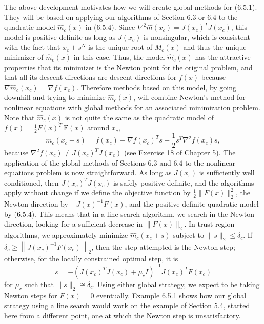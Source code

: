 The above development motivates how we will create global methods for (6.5.1). They will be based on applying our algorithms of Section \(6.3\) or \(6.4\) to the quadratic model \(\hat{m}_{c}(x)\) in (6.5.4). Since \(\nabla^{2} \hat{m}\left(x_{c}\right)=J\left(x_{c}\right)^{T} J\left(x_{c}\right)\), this model is positive definite as long as \(J\left(x_{c}\right)\) is nonsingular, which is consistent with the fact that \(x_{c}+s^{N}\) is the unique root of \(M_{c}(x)\) and thus the unique minimizer of \(\hat{m}_{c}(x)\) in this case. Thus, the model \(\hat{m}_{c}(x)\) has the attractive properties that its minimizer is the Newton point for the original problem, and that all its descent directions are descent directions for \(f(x)\) because \(\nabla \hat{m}_{c}\left(x_{c}\right)=\nabla f\left(x_{c}\right)\). Therefore methods based on this model, by going downhill and trying to minimize \(\hat{m}_{c}(x)\), will combine Newton's method for nonlinear equations with global methods for an associated minimization problem. Note that \(\hat{m}_{c}(x)\) is not quite the same as the quadratic model of \(f(x)=\frac{1}{2} F(x)^{T} \mathrm{~F}(x)\) around \(x_{c}\),
\[
m_{c}\left(x_{c}+s\right)=f\left(x_{c}\right)+\nabla f\left(x_{c}\right)^{T} s+\frac{1}{2} s^{T} \nabla^{2} f\left(x_{c}\right) s,
\]
because \(\nabla^{2} f\left(x_{c}\right) \neq J\left(x_{c}\right)^{T} J\left(x_{c}\right)\) (see Exercise 18 of Chapter 5).
The application of the global methods of Sections \(6.3\) and \(6.4\) to the nonlinear equations problem is now straightforward. As long as \(J\left(x_{\epsilon}\right)\) is sufficiently well conditioned, then \(J\left(x_{c}\right)^{T} J\left(x_{c}\right)\) is safely positive definite, and the algorithms apply without change if we define the objective function by \(\frac{1}{2}\|F(x)\|_{2}^{2}\), the Newton direction by \(-J(x)^{-1} F(x)\), and the positive definite quadratic model by (6.5.4). This means that in a line-search algorithm, we search in the Newton direction, looking for a sufficient decrease in \(\|F(x)\|_{2}\). In trust region algorithms, we approximately minimize \(\hat{m}_{c}\left(x_{c}+s\right)\) subject to \(\|s\|_{2} \leq \delta_{c}\). If \(\delta_{c} \geq\left\|J\left(x_{c}\right)^{-1} F\left(x_{c}\right)\right\|_{2}\), then the step attempted is the Newton step; otherwise, for the locally constrained optimal step, it is
\[
s=-\left(J\left(x_{c}\right)^{T} J\left(x_{c}\right)+\mu_{c} I\right)^{-1} J\left(x_{c}\right)^{T} F\left(x_{c}\right)
\]
for \(\mu_{c}\) such that \(\|s\|_{2} \cong \delta_{c}\). Using either global strategy, we expect to be taking Newton steps for \(F(x)=0\) eventually. Example 6.5.1 shows how our global strategy using a line search would work on the example of Section 5.4, started here from a different point, one at which the Newton step is unsatisfactory.


